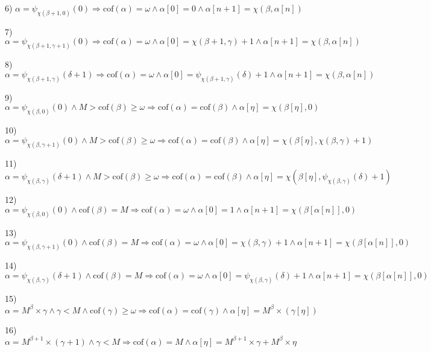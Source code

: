 \documentclass[10pt]{article}
\begin{document}
\bigskip

6) \(\alpha=\psi _{\chi(\beta+1,0)}(0) \Rightarrow \text{cof}(\alpha)=\omega \wedge \alpha[0]=0 \wedge \alpha[n+1]=\chi(\beta,\alpha[n])\)

7) \(\alpha=\psi _{\chi(\beta+1,\gamma+1)}(0) \Rightarrow \text{cof}(\alpha)=\omega \wedge \alpha[0]=\chi(\beta+1,\gamma)+1 \wedge \alpha[n+1]=\chi(\beta,\alpha[n])\)

8) \(\alpha=\psi_{\chi(\beta+1,\gamma)}(\delta+1) \Rightarrow \text{cof}(\alpha)=\omega \wedge \alpha[0]= \psi_{\chi(\beta+1,\gamma)}(\delta)+1 \wedge \alpha[n+1]=\chi(\beta,\alpha[n])\)

\bigskip

9) \(\alpha=\psi _{\chi(\beta,0)}(0) \wedge M>\text{cof}(\beta)\geq\omega \Rightarrow \text{cof} (\alpha)= \text{cof} (\beta) \wedge \alpha[\eta]=\chi(\beta[\eta],0)\)

10) \(\alpha=\psi_{ \chi(\beta,\gamma+1)}(0) \wedge M>\text{cof}(\beta)\geq\omega \Rightarrow \text{cof}(\alpha)=\text{cof}(\beta)\wedge \alpha[\eta]=\chi(\beta[\eta],\chi(\beta,\gamma)+1)\)

11) \(\alpha=\psi_{ \chi(\beta,\gamma)}(\delta+1) \wedge M>\text{cof} (\beta)\geq\omega \Rightarrow \text{cof}(\alpha)=\text{cof}(\beta) \wedge \alpha[\eta]=\chi(\beta[\eta],\psi_{\chi(\beta,\gamma)}(\delta)+1)\)

\bigskip

12) \(\alpha=\psi_{\chi(\beta,0)}(0) \wedge \text{cof}(\beta)=M\Rightarrow \text{cof}(\alpha)= \omega \wedge \alpha[0]=1 \wedge \alpha[n+1]=\chi(\beta[\alpha[n]],0)\)

13) \(\alpha=\psi_{ \chi(\beta,\gamma+1)}(0) \wedge \text{cof} (\beta)=M \Rightarrow \text{cof} (\alpha)= \omega \wedge \alpha[0]=\chi(\beta,\gamma)+1 \wedge \alpha[n+1]=\chi(\beta[\alpha[n]],0)\)

14) \(\alpha=\psi_{\chi(\beta,\gamma)}(\delta+1) \wedge \text{cof} (\beta)=M \Rightarrow \text{cof} (\alpha)= \omega \wedge \alpha[0]= \psi_{ \chi(\beta,\gamma)}(\delta)+1 \wedge \alpha[n+1]=\chi(\beta[\alpha[n]],0)\)

\bigskip

15) \(\alpha=M^{\beta}\times\gamma \wedge \gamma<M \wedge \text{cof} (\gamma)\geq\omega \Rightarrow \text{cof} (\alpha)= \text{cof}(\gamma)\wedge\alpha[\eta]=M^{\beta}\times(\gamma[\eta])\)

16) \(\alpha=M^{\beta+1}\times(\gamma+1) \wedge \gamma<M \Rightarrow \text{cof} (\alpha)=M \wedge\alpha[\eta]=M^{\beta+1}\times\gamma+M^\beta\times\eta\)
\end{document}
